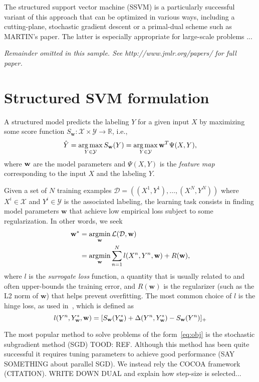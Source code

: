 \documentclass[twoside,11pt]{article}
\newcommand{\w}{{\bf w}}
\DeclareMathOperator*{\argmax}{arg\,max}
\DeclareMathOperator*{\argmin}{\arg\!\min} %
\begin{document}
The structured support vector machine (SSVM) is a particularly successful variant of this approach that can be optimized in various ways, including a cutting-plane, stochastic gradient descent or a primal-dual scheme such as MARTIN's paper. The latter is especially appropriate for large-scale problems ...

{\noindent \em Remainder omitted in this sample. See http://www.jmlr.org/papers/ for full paper.}

\section{Structured SVM formulation}

A structured model predicts the labeling $Y$ for a given input $X$ by maximizing some score function
$S_\mathbf{w}:\mathcal{X} \times \mathcal{Y} \rightarrow \mathbb{R}$,
i.e.,
%
\begin{equation}
\label{eq:inference}
\hat{Y} = \argmax_{Y \in \mathcal{Y}} S_\w(Y) = \argmax_{Y \in \mathcal{Y}} \w^T\Psi(X,Y),
\end{equation}
%
where $\w$ are the model parameters and $\Psi(X,Y)$ is the \emph{feature map} corresponding to the input $X$ and the labeling $Y$.


Given a set of $N$ training examples $\mathcal{D}=((X^1,Y^1), \dots, (X^N,Y^N))$ where $X^i \in \mathcal{X}$ and $Y^i \in \mathcal{Y}$ is the associated labeling, 
the learning task consists in finding model parameters $\mathbf{w}$ that
achieve low empirical loss subject to some regularization. In other words, we seek
%
\begin{align}
\label{eq:obj}
\nonumber
\w^* &= \argmin_\w \mathcal{L}(\mathcal{D}, \w) \\
& = \argmin_{\w} \sum_{n=1}^N l(X^n, Y^n, \w) + R(\w),
\end{align}
%
where $l$ is the \emph{surrogate loss} function,
a quantity that is usually related to and often upper-bounds the training error, 
and $R(\mathbf{w})$ is the regularizer (such as the L2 norm of $\mathbf{w}$)
that helps prevent overfitting. 
The most common choice of $l$ is the hinge
loss, as used in~\cite{Taskar03,Tsochantaridis04}, which is defined as
\begin{equation}
\label{eq:hinge-loss}
l(Y^n, Y^*_\mathbf{w}, \w) = [S_\mathbf{w}(Y^*_\w) + \Delta(Y^n,Y^*_\w) - S_\w(Y^n)]_+
\end{equation}


The most popular method to solve problems of the form~\ref{eq:obj} is the stochastic subgradient method (SGD) TOOD: REF. Although this method has been quite successful it requires tuning parameters to achieve good performance (SAY SOMETHING about parallel SGD). We instead rely the COCOA framework (CITATION). WRITE DOWN DUAL and explain how step-size is selected...
\end{document}
